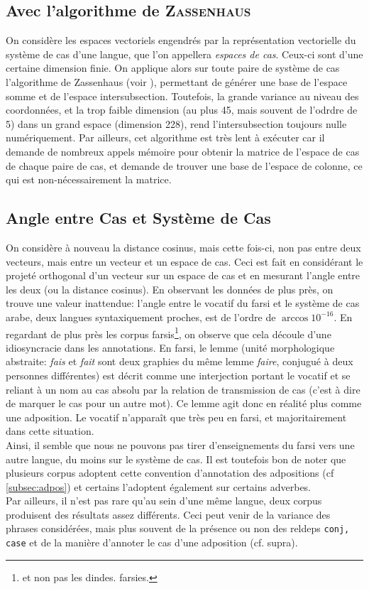 \documentclass{cours}
\begin{document}
\subsection{Avec l'algorithme de \textsc{Zassenhaus}}\label{subsec:zassenhaus}
On considère les espaces vectoriels engendrés par la représentation vectorielle du système de cas d'une langue, que l'on appellera \textit{espaces de cas}.
Ceux-ci sont d'une certaine dimension finie.
On applique alors sur toute paire de système de cas l'algorithme de Zassenhaus (voir \cite{zassenhaus}), permettant de générer une base de l'espace somme et de l'espace intersubsection.
Toutefois, la grande variance au niveau des coordonnées, et la trop faible dimension (au plus 45, mais souvent de l'odrdre de 5) dans un grand espace (dimension 228), rend l'intersubsection toujours nulle numériquement.
Par ailleurs, cet algorithme est très lent à exécuter car il demande de nombreux appels mémoire pour obtenir la matrice de l'espace de cas de chaque paire de cas, et demande de trouver une base de l'espace de colonne, ce qui est non-nécessairement la matrice.

\subsection{Angle entre Cas et Système de Cas}\label{subsec:projection}
On considère à nouveau la distance cosinus, mais cette fois-ci, non pas entre deux vecteurs, mais entre un vecteur et un espace de cas.
Ceci est fait en considérant le projeté orthogonal d'un vecteur sur un espace de cas et en mesurant l'angle entre les deux (ou la distance cosinus).
En observant les données de plus près, on trouve une valeur inattendue: l'angle entre le vocatif du farsi et le système de cas arabe, deux langues syntaxiquement proches, est de l'ordre de $\arccos{10^{-16}}$.
En regardant de plus près les corpus farsis\footnote{et non pas les dindes. farsies.}, on observe que cela découle d'une idiosyncracie dans les annotations.
En farsi, le lemme (unité morphologique abstraite: \textsl{fais} et \textsl{fait} sont deux graphies du même lemme \textsl{faire}, conjugué à deux personnes différentes)\label{farsi}
est décrit comme une interjection portant le vocatif et se reliant à un nom au cas absolu par la relation de transmission de cas (c'est à dire de marquer le cas pour un autre mot).
Ce lemme agit donc en réalité plus comme une adposition.
Le vocatif n'apparaît que très peu en farsi, et majoritairement dans cette situation.\\
Ainsi, il semble que nous ne pouvons pas tirer d'enseignements du farsi vers une autre langue, du moins sur le système de cas.
Il est toutefois bon de noter que plusieurs corpus adoptent cette convention d'annotation des adpositions (cf \ref{subsec:adpos}) et certains l'adoptent également sur certains adverbes.\\
Par ailleurs, il n'est pas rare qu'au sein d'une même langue, deux corpus produisent des résultats assez différents. Ceci peut venir de la variance des phrases considérées, mais plus souvent de la présence ou non des reldeps \texttt{conj, case} et de la manière d'annoter le cas d'une adposition (cf. supra).
\end{document}
